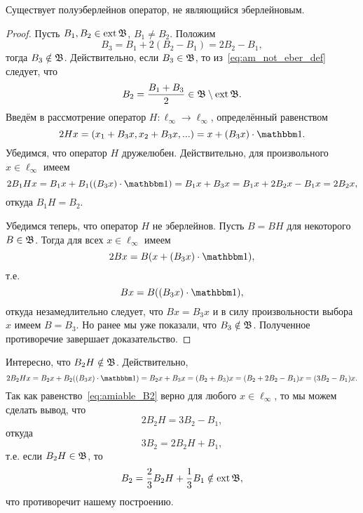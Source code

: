 \begin{theorem}
	\label{thm:amiable_but_not_Eberlein_exists}
	Существует полуэберлейнов оператор, не являющийся эберлейновым.
\end{theorem}

\begin{proof}
	Пусть $B_1, B_2 \in \operatorname{ext} \mathfrak{B}$, $B_1 \ne B_2$.
	Положим
	\begin{equation}
		\label{eq:am_not_eber_def}
		B_3 = B_1 + 2(B_2-B_1) = 2B_2-B_1,
	\end{equation}
	тогда $B_3 \notin \mathfrak{B}$.
	Действительно, если $B_3 \in \mathfrak{B}$, то из~\eqref{eq:am_not_eber_def} следует, что
	\begin{equation}
		B_2 = \frac{B_1 + B_3}2 \in \mathfrak{B} \setminus \operatorname{ext} \mathfrak{B}
		.
	\end{equation}
	Введём в рассмотрение оператор $H:\ell_\infty\to\ell_\infty$, определённый равенством
	\begin{equation}
		2Hx = (x_1 + B_3x, x_2 + B_3x, ...) = x + (B_3 x) \cdot \one
		.
	\end{equation}
	Убедимся, что оператор $H$ дружелюбен.
	Действительно, для произвольного $x\in\ell_\infty$ имеем
	\begin{equation}
		2 B_1 H x = B_1 x + B_1 ((B_3 x) \cdot\one) = B_1 x + B_3 x =
		B_1 x + 2 B_2 x - B_1 x = 2B_2 x
		,
	\end{equation}
	откуда $B_1 H = B_2$.

	Убедимся теперь, что оператор $H$ не эберлейнов.
	Пусть $B = BH$ для некоторого $B\in\mathfrak{B}$.
	Тогда для всех $x\in\ell_\infty$ имеем
	\begin{equation}
		2Bx = B (x + (B_3 x) \cdot \one)
		,
	\end{equation}
	т.е.
	\begin{equation}
		Bx =  B((B_3 x) \cdot \one)
		,
	\end{equation}
	откуда незамедлительно следует, что $Bx = B_3x$ и в силу произвольности выбора $x$ имеем $B=B_3$.
	Но ранее мы уже показали, что $B_3\notin \mathfrak{B}$.
	Полученное противоречие завершает доказательство.
\end{proof}

\begin{remark}
	Интересно, что $B_2H\notin \mathfrak{B}$.
	Действительно,
	\begin{equation}
		\label{eq:amiable_B2}
		2B_2 H x = B_2 x + B_2((B_3 x)\cdot \one) = B_2 x + B_3 x  =
		(B_2 + B_3) x  = (B_2+2B_2-B_1)x = (3B_2-B_1)x
		.
	\end{equation}
	Так как равенство~\eqref{eq:amiable_B2} верно для любого $x\in\ell_\infty$,
	то мы можем сделать вывод, что
	\begin{equation}
		2B_2H = 3B_2-B_1
		,
	\end{equation}
	откуда
	\begin{equation}
		3B_2 = 2B_2H  + B_1
		,
	\end{equation}
	т.е. если $B_2H\in\mathfrak{B}$, то
	\begin{equation}
		B_2 = \frac23 B_2H  + \frac13 B_1 \notin \operatorname{ext}\mathfrak{B}
		,
	\end{equation}
	что противоречит нашему построению.
\end{remark}

